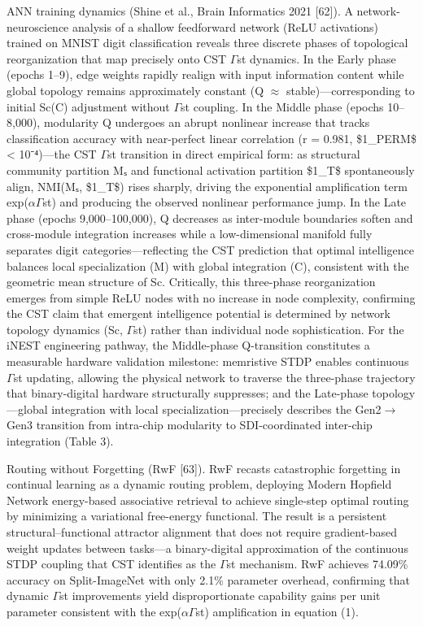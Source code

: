 \documentclass[a4paper,12pt]{article}
\begin{document}
ANN training dynamics (Shine et al., Brain Informatics 2021 [62]). A network-neuroscience analysis of a shallow feedforward network (ReLU activations) trained on MNIST digit classification reveals three discrete phases of topological reorganization that map precisely onto CST $\Gamma$st dynamics. In the Early phase (epochs 1--9), edge weights rapidly realign with input information content while global topology remains approximately constant (Q $\approx$ stable)---corresponding to initial Sc(C) adjustment without $\Gamma$st coupling. In the Middle phase (epochs 10--8,000), modularity Q undergoes an abrupt nonlinear increase that tracks classification accuracy with near-perfect linear correlation (r = 0.981, \$1_{PERM}\$ < 10⁻⁴)—the CST $\Gamma$st transition in direct empirical form: as structural community partition Mₛ and functional activation partition \$1_{T}\$ spontaneously align, NMI(Mₛ, \$1_{T}\$) rises sharply, driving the exponential amplification term exp($\alpha$\cdot$\Gamma$st) and producing the observed nonlinear performance jump. In the Late phase (epochs 9,000–100,000), Q decreases as inter-module boundaries soften and cross-module integration increases while a low-dimensional manifold fully separates digit categories—reflecting the CST prediction that optimal intelligence balances local specialization (M) with global integration (C), consistent with the geometric mean structure of Sc. Critically, this three-phase reorganization emerges from simple ReLU nodes with no increase in node complexity, confirming the CST claim that emergent intelligence potential is determined by network topology dynamics (Sc, $\Gamma$st) rather than individual node sophistication. For the iNEST engineering pathway, the Middle-phase Q-transition constitutes a measurable hardware validation milestone: memristive STDP enables continuous $\Gamma$st updating, allowing the physical network to traverse the three-phase trajectory that binary-digital hardware structurally suppresses; and the Late-phase topology—global integration with local specialization—precisely describes the Gen2$\rightarrow$Gen3 transition from intra-chip modularity to SDI-coordinated inter-chip integration (Table 3).


Routing without Forgetting (RwF [63]). RwF recasts catastrophic forgetting in continual learning as a dynamic routing problem, deploying Modern Hopfield Network energy-based associative retrieval to achieve single-step optimal routing by minimizing a variational free-energy functional. The result is a persistent structural--functional attractor alignment that does not require gradient-based weight updates between tasks---a binary-digital approximation of the continuous STDP coupling that CST identifies as the $\Gamma$st mechanism. RwF achieves 74.09\% accuracy on Split-ImageNet with only 2.1\% parameter overhead, confirming that dynamic $\Gamma$st improvements yield disproportionate capability gains per unit parameter consistent with the exp($\alpha$\cdot$\Gamma$st) amplification in equation (1).
\end{document}
